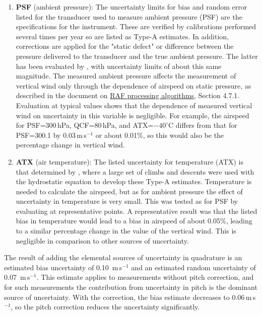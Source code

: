 \documentclass[12pt,twoside,english]{article}\usepackage[]{graphicx}\usepackage[]{color}
\let\OrgIndex\index
\renewcommand*{\index}[1]{\OrgIndex{#1}}
\begin{document}
{{\begin{enumerate}
\item \textbf{PSF} (ambient pressure): The uncertainty limits for bias and random error listed for the transducer used to measure ambient pressure (PSF) are the specifications for the instrument. These are verified by calibrations performed several times per year so are listed as Type-A estimates. In addition, corrections are applied for the "static defect" or difference between the pressure delivered to the transducer and the true ambient pressure. The latter has been evaluated by \citet{CooperEtAl2014}, with uncertainty limits of about this same magnitude. The measured ambient pressure affects the measurement of vertical wind only through the dependence of airspeed on static pressure, as described in the document on \href{https://drive.google.com/file/d/0B1kIUH45ca5ATFV5d3QyQ0JpSjA/view?usp=sharing}{RAF processing algorithms}, Section 4.7.1. Evaluation at typical values shows that the dependence of measured vertical wind on uncertainty in this variable is negligible. For example, the airspeed for PSF=300\,hPa, QCF=80\,hPa, and ATX=$-40^{\circ}$C differs from that for PSF=300.1 by 0.03\,m\,s$^{-1}$ or about 0.01\%, so this would also be the percentage change in vertical wind.  
\item \textbf{ATX} (air temperature): The listed uncertainty for temperature (ATX) is that determined by \citet{CooperEtAl2014}, where a large set of climbs and descents were used with the hydrostatic equation to develop these Type-A estimates. Temperature is needed to calculate the airspeed, but as for ambient pressure the effect of uncertainty in temperature is very small. This was tested as for PSF by evaluating at representative points. A representative result was that the listed bias in temperature would lead to a bias in airspeed of about 0.05\%, leading to a similar percentage change in the value of the vertical wind. This is negligible in comparison to other sources of uncertainty.  
\end{enumerate}

The result of adding the elemental sources of uncertainty in quadrature is an estimated bias uncertainty of %
0.10~m\,s$^{-1}$ and an estimated random uncertainty of %
0.07~m\,s$^{-1}$. This estimate applies to measurements without pitch correction, and for such measurements the contribution from uncertainty in pitch is the dominant source of uncertainty. With the correction, the bias estimate decreases to 0.06\,m\,s$^{-1}$, so the pitch correction reduces the uncertainty significantly. 

}}
\end{document}
